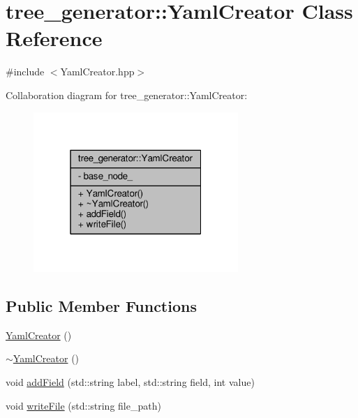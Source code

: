 \hypertarget{classtree__generator_1_1YamlCreator}{\section{tree\-\_\-generator\-:\-:Yaml\-Creator Class Reference}
\label{classtree__generator_1_1YamlCreator}
}


{\ttfamily \#include $<$Yaml\-Creator.\-hpp$>$}



Collaboration diagram for tree\-\_\-generator\-:\-:Yaml\-Creator\-:\nopagebreak
\begin{figure}[H]
\begin{center}
\leavevmode
\includegraphics[width=220pt]{df/d63/classtree__generator_1_1YamlCreator__coll__graph}
\end{center}
\end{figure}
\subsection*{Public Member Functions}
\begin{DoxyCompactItemize}
\item 
\hyperlink{classtree__generator_1_1YamlCreator_a3f6974a64bcceaa2c6e6bb073e760000_a3f6974a64bcceaa2c6e6bb073e760000}{Yaml\-Creator} ()
\item 
\hyperlink{classtree__generator_1_1YamlCreator_ab1d128e8feaf7d64c3a5b9a961e140b7_ab1d128e8feaf7d64c3a5b9a961e140b7}{$\sim$\-Yaml\-Creator} ()
\item 
void \hyperlink{classtree__generator_1_1YamlCreator_aedbf0bc9538c49e16c2185703a40815b_aedbf0bc9538c49e16c2185703a40815b}{add\-Field} (std\-::string label, std\-::string field, int value)
\item 
void \hyperlink{classtree__generator_1_1YamlCreator_af1260eb2488a08879a8cd63418ec571b_af1260eb2488a08879a8cd63418ec571b}{write\-File} (std\-::string file\-\_\-path)
\end{DoxyCompactItemize}
